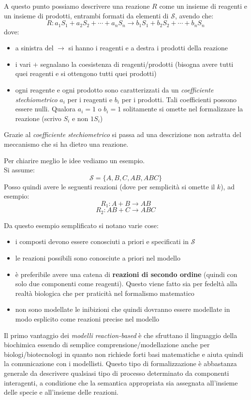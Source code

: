\documentclass[a4paper,12pt, oneside]{book}
\begin{document}
A questo punto possiamo descrivere una reazione $R$ come un insieme di reagenti
e un insieme di prodotti, entrambi formati da elementi di $\mathcal{S}$, avendo
che: 
\[R:a_1S_1+a_2S_2+\cdots+a_nS_n\to b_1S_1+b_2S_2+\cdots+b_nS_n\]
dove:
\begin{itemize}
  \item a sinistra del $\to$ si hanno i reagenti e a destra i prodotti della
  reazione
  \item i vari $+$ segnalano la coesistenza di reagenti/prodotti (bisogna avere
  tutti quei reagenti e si ottengono tutti quei prodotti)
  \item ogni reagente e ogni prodotto sono caratterizzati da un
  \textit{coefficiente stechiometrico} $a_i$ per i reagenti e  $b_i$ per i
  prodotti. Tali coefficienti possono essere nulli. Qualora $a_i=1$ o $b_i=1$
  solitamente si omette nel formalizzare la reazione (scrivo $S_i$ e non $1S_i$)
\end{itemize}
Grazie al \textit{coefficiente stechiometrico} si passa ad una descrizione non
astratta del meccanismo che si ha dietro una reazione.
\begin{esempio}
  Per chiarire meglio le idee vediamo un esempio.\\
  Si assume:
  \[\mathcal{S}=\{A,B,C,AB,ABC\}\]
  Posso quindi avere le seguenti reazioni (dove per semplicità si omette il
  $k$), ad esempio: 
  \[R_1:A+B\to AB\]
  \[R_2:AB+C\to ABC\]
\end{esempio}
\noindent
Da questo esempio semplificato si notano varie cose:
\begin{itemize}
  \item i composti devono essere conosciuti a priori e specificati in
  $\mathcal{S}$
  \item le reazioni possibili sono conosciute a priori nel modello
  \item è preferibile avere una catena di\textbf{ reazioni di secondo ordine}
  (quindi con 
  solo due componenti come reagenti). Questo viene fatto sia per fedeltà alla
  realtà biologica che per praticità nel formalismo matematico
  \item non sono modellate le inibizioni che quindi dovranno essere modellate in
  modo esplicito come reazioni precise nel modello
\end{itemize}
Il primo vantaggio dei \textit{modelli reaction-based} è che sfruttano il
linguaggio della biochimica essendo di semplice comprensione/modellazione anche
per biologi/biotecnologi in quanto non richiede forti basi matematiche e aiuta
quindi la comunicazione con i modellisti. Questo tipo di formalizzazione è
abbastanza generale da descrivere qualsiasi tipo di processo determinato da
componenti interagenti, a condizione che la semantica appropriata sia assegnata
all'insieme delle specie e all'insieme delle reazioni.
\end{document}
